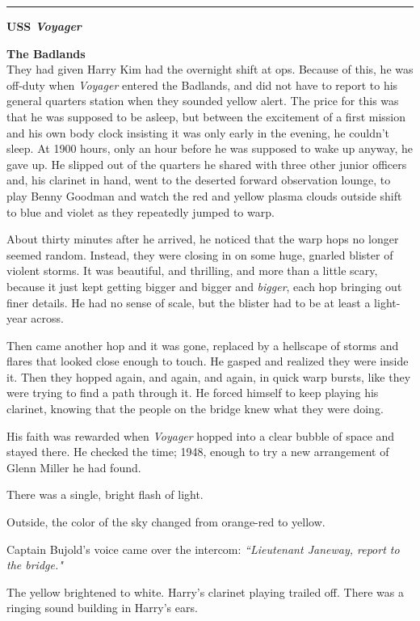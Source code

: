 \documentclass[twoside,letterpaper,12pt]{memoir}
\begin{document}
\fancybreak{\rule{3cm}{0.4 pt}}
\noindent\textbf{USS \textit{Voyager}}

\noindent\textbf{The Badlands}\\

They had given Harry Kim had the overnight shift at ops. Because of this, he was off-duty when \textit{Voyager} entered the Badlands, and did not have to report to his general quarters station when they sounded yellow alert. The price for this was that he was supposed to be asleep, but between the excitement of a first mission and his own body clock insisting it was only early in the evening, he couldn't sleep. At 1900 hours, only an hour before he was supposed to wake up anyway, he gave up. He slipped out of the quarters he shared with three other junior officers and, his clarinet in hand, went to the deserted forward observation lounge, to play Benny Goodman and watch the red and yellow plasma clouds outside shift to blue and violet as they repeatedly jumped to warp.

About thirty minutes after he arrived, he noticed that the warp hops no longer seemed random. Instead, they were closing in on some huge, gnarled blister of violent storms. It was beautiful, and thrilling, and more than a little scary, because it just kept getting bigger and bigger and \textit{bigger}, each hop bringing out finer details. He had no sense of scale, but the blister had to be at least a light-year across.

Then came another hop and it was gone, replaced by a hellscape of storms and flares that looked close enough to touch. He gasped and realized they were inside it. Then they hopped again, and again, and again, in quick warp bursts, like they were trying to find a path through it. He forced himself to keep playing his clarinet, knowing that the people on the bridge knew what they were doing.

His faith was rewarded when \textit{Voyager} hopped into a clear bubble of space and stayed there. He checked the time; 1948, enough to try a new arrangement of Glenn Miller he had found.

There was a single, bright flash of light.

Outside, the color of the sky changed from orange-red to yellow.

Captain Bujold's voice came over the intercom: \textit{``Lieutenant Janeway, report to the bridge."}

The yellow brightened to white. Harry’s clarinet playing trailed off. There was a ringing sound building in Harry's ears.
\end{document}
